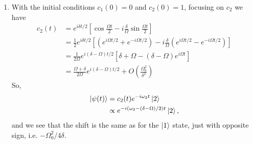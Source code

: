 \documentclass[12pt]{article}
\begin{document}
\begin{enumerate}[label=(\alph*)]
    \item With the initial conditions $c_1(0) = 0$ and $c_2(0) = 1$, focusing on $c_2$ we have 
    \begin{align*}
        c_2(t) &= e^{i\delta t/2}\left[\cos\frac{\Omega t}{2} - i\frac{\delta}{\Omega}\sin\frac{\Omega t}{2}\right] \\
        &= \frac{1}{2}e^{i\delta t/2}\left[\left(e^{i\Omega t/2} + e^{-i\Omega t/2}\right) - i\frac{\delta}{\Omega}\left(e^{i\Omega t/2} - e^{-i\Omega t/2}\right)\right] \\
        &= \frac{1}{2\Omega}e^{i(\delta-\Omega)t/2}\left[\delta + \Omega - (\delta-\Omega)e^{i\Omega t}\right] \\
        &= \frac{\Omega + \delta}{2\Omega}e^{i(\delta-\Omega)t/2} + O(\frac{\Omega_0^2}{\delta^2})
    \end{align*}
    So,
    \begin{align*}
        \ket{\psi(t)} &= c_2(t)e^{-i\omega_2t}\ket{2} \\
        &\propto e^{-i(\omega_2-(\delta-\Omega)/2)t}\ket{2},
    \end{align*}
    and we see that the shift is the same as for the $\ket{1}$ state, just with opposite sign, i.e. $-\Omega_0^2/4\delta$.
\end{enumerate}


\end{document}
